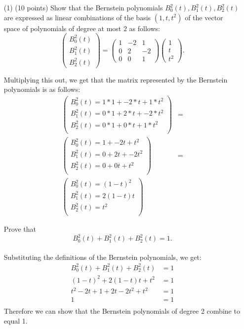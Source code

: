 \documentclass[12pt]{article}
\begin{document}
\begin{itemize}
 \item[(1)](10 points)
Show that the Bernstein polynomials $B_0^2(t), B_1^2(t), B_2^2(t)$
are expressed as linear combinations of the basis
$(1, t, t^2)$ of the vector space of polynomials of degree at most $2$ 
as follows:
\[
\begin{pmatrix}
B_0^2(t)\\
B_1^2(t)\\
B_2^2(t)
\end{pmatrix} = 
\begin{pmatrix}
1 & -2  & 1 \\
0 &  2  & -2 \\
0 &  0  & 1  
\end{pmatrix} 
\begin{pmatrix}
1 \\
t \\
t^2
\end{pmatrix}. 
\]

Multiplying this out, we get that the matrix represented by the Bernstein polynomials is as follows: 
\begin{align*}
    \begin{pmatrix}
    B_0^2(t) = 1 * 1 + -2 * t + 1 * t^2 \\
    B_1^2(t) = 0 * 1 + 2 * t + -2 * t^2 \\
    B_2^2(t) = 0 * 1 + 0 * t + 1 * t^2 \\
    \end{pmatrix} &= \\
    \begin{pmatrix}
    B_0^2(t) = 1 + -2t + t^2 \\
    B_1^2(t) = 0 + 2t + -2t^2 \\
    B_2^2(t) = 0 + 0t + t^2 \\
    \end{pmatrix} &= \\
    \begin{pmatrix}
    B_0^2(t) = (1 - t)^2 \\
    B_1^2(t) = 2(1 - t)t \\
    B_2^2(t) = t^2 \\
    \end{pmatrix}
\end{align*}

Prove that
\[
B_0^2(t) +  B_1^2(t) +  B_2^2(t) = 1.
\] \\

Substituting the definitions of the Bernstein polynomials, we get:
\begin{align*}
    B_0^2(t) +  B_1^2(t) +  B_2^2(t) &= 1 \\
    (1 - t)^2 + 2(1 - t)t + t^2 &= 1 \\
    t^2 - 2t + 1 + 2t - 2t^2 + t^2 &= 1 \\
    1 &= 1 \\
\end{align*}
Therefore we can show that the Bernstein polynomials of degree 2 combine to equal 1.


\end{itemize}
\end{document}

